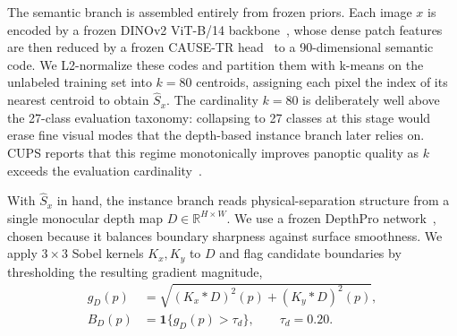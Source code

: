 \documentclass{article}
\begin{document}
The semantic branch is assembled entirely from frozen priors. Each image $x$ is encoded by a frozen DINOv2 ViT-B/14 backbone~\cite{oquab2024dinov2}, whose dense patch features are then reduced by a frozen CAUSE-TR head~\cite{kim2024cause} to a 90-dimensional semantic code. We L2-normalize these codes and partition them with k-means on the unlabeled training set into $k = 80$ centroids, assigning each pixel the index of its nearest centroid to obtain $\hat S_x$. The cardinality $k = 80$ is deliberately well above the 27-class evaluation taxonomy: collapsing to 27 classes at this stage would erase fine visual modes that the depth-based instance branch later relies on. CUPS reports that this regime monotonically improves panoptic quality as $k$ exceeds the evaluation cardinality~\cite{hahn2025cups}.

With $\hat S_x$ in hand, the instance branch reads physical-separation structure from a single monocular depth map $D \in \mathbb{R}^{H \times W}$. We use a frozen DepthPro network~\cite{bochkovskii2024depthpro}, chosen because it balances boundary sharpness against surface smoothness. We apply $3 \times 3$ Sobel kernels $K_x, K_y$ to $D$ and flag candidate boundaries by thresholding the resulting gradient magnitude,
\begin{equation}
\begin{aligned}
g_D(p) &= \sqrt{(K_x * D)^2(p) + (K_y * D)^2(p)}, \\
B_D(p) &= \mathbf{1}\{g_D(p) > \tau_d\}, \qquad \tau_d = 0.20 .
\end{aligned}
\label{eq:depth_boundary}
\end{equation}
\end{document}

